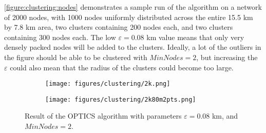 
\autoref{figure:clustering:nodes} demonstrates a sample run of the algorithm on a network of 2000 nodes, with 1000 nodes uniformly distributed across the entire 15.5 km by 7.8 km area, two clusters containing 200 nodes each, and two clusters containing 300 nodes each. The low $\varepsilon = 0.08$ km value means that only very densely packed nodes will be added to the clusters. Ideally, a lot of the outliers in the figure should be able to be clustered with $MinNodes=2$, but increasing the $\varepsilon$ could also mean that the radius of the clusters could become too large.

\begin{figure}[ht]
    \centering
    \begin{subfigure}[t]{.31\textwidth}
        \texttt{[image: figures/clustering/2k.png]}
        \label{figure:clustering:2knodes}
    \end{subfigure}
    \begin{subfigure}[t]{.3223\textwidth}
        \texttt{[image: figures/clustering/2k80m2pts.png]}
        \label{figure:clustering:2k80m2ptsnodes}
    \end{subfigure}
    \caption{Result of the OPTICS algorithm with parameters $\varepsilon = 0.08$ km, and $MinNodes = 2$.}
    \label{figure:clustering:nodes}
\end{figure}


